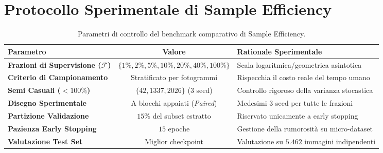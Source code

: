 \section{Protocollo Sperimentale di Sample Efficiency}
\label{sec:app_sample_params}

\begin{table}[htbp]
\centering
\small
\begin{tabularx}{\textwidth}{lcL}
\toprule
\textbf{Parametro} & \textbf{Valore} & \textbf{Rationale Sperimentale} \\
\midrule
\textbf{Frazioni di Supervisione ($\mathcal{F}$)} & $\{1\%, 2\%, 5\%, 10\%, 20\%, 40\%, 100\%\}$ & Scala logaritmica/geometrica asintotica \\
\textbf{Criterio di Campionamento} & Stratificato per fotogrammi & Rispecchia il costo reale del tempo umano \\
\textbf{Semi Casuali ($< 100\%$)} & $\{42, 1337, 2026\}$ (3 seed) & Controllo rigoroso della varianza stocastica \\
\textbf{Disegno Sperimentale} & A blocchi appaiati (\textit{Paired}) & Medesimi 3 seed per tutte le frazioni \\
\textbf{Partizione Validazione} & $15\%$ del subset estratto & Riservato unicamente a early stopping \\
\textbf{Pazienza Early Stopping} & $15$ epoche & Gestione della rumorosità su micro-dataset \\
\textbf{Valutazione Test Set} & Miglior checkpoint & Valutazione su $5.462$ immagini indipendenti \\
\bottomrule
\end{tabularx}
\caption{Parametri di controllo del benchmark comparativo di Sample Efficiency.}
\label{tab:app_sample_params}
\end{table}
